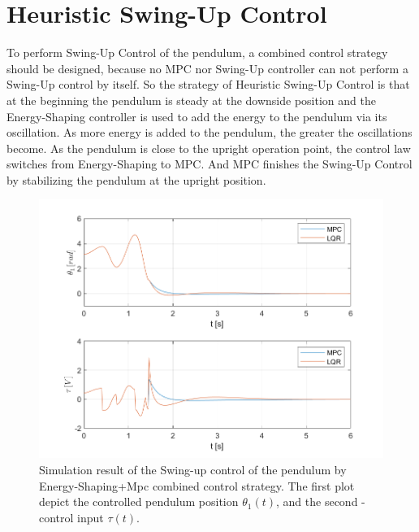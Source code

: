\section{Heuristic Swing-Up Control}
To perform Swing-Up Control of the pendulum, a combined control strategy should be designed, because no MPC nor Swing-Up controller can not perform a Swing-Up control by itself. So the strategy of Heuristic Swing-Up Control is that at the beginning the pendulum is steady at the downside position and the Energy-Shaping controller is used to add the energy to the pendulum via its oscillation. As more energy is added to the pendulum, the greater the oscillations become. As the pendulum is close to the upright operation point, the control law switches from Energy-Shaping to MPC. And MPC finishes the Swing-Up Control by stabilizing the pendulum at the upright position.
\begin{figure}[H]
	\centering
	\includegraphics[width=1.1\linewidth]{images/MPC-LQR_Swing}
	\caption{Simulation result of the Swing-up control of the pendulum by Energy-Shaping+Mpc combined control strategy. The first plot depict the controlled pendulum position $\theta_1(t)$, and the second - control input $\tau(t)$.}
	\label{combo}
\end{figure}
\newpage
